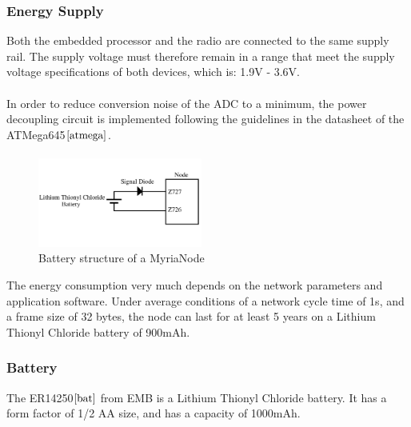 \documentclass[a4paper,10pt]{report}
\begin{document}
\subsubsection{Energy Supply}
Both the embedded processor and the radio are connected to the same supply rail. The supply voltage must therefore remain in a range that meet the supply voltage specifications of both devices, which is: 1.9V - 3.6V. \paragraph*{}
In order to reduce conversion noise of the ADC to a minimum, the power decoupling circuit is implemented following the guidelines in the datasheet of the ATMega645$\cite{atmega}$. \paragraph*{}
\begin{figure}
  \begin{center}
    \includegraphics[width=0.48\textwidth]{battery}
  \end{center}
  \caption{Battery structure of  a MyriaNode}
  \label{battery}
\end{figure}
The energy consumption very much depends on the network parameters and application software. Under average conditions of a network cycle time of 1s, and a frame size of 32 bytes, the node can last for at least 5 years on a Lithium Thionyl Chloride battery of 900mAh.
\subsubsection{Battery}
The ER14250$\cite{bat}$ from EMB is a Lithium Thionyl Chloride battery. It has a form factor of 1/2 AA size, and has a capacity of 1000mAh.
\end{document}
